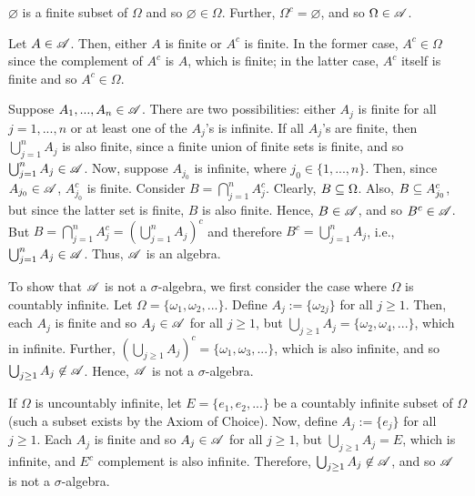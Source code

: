 \begin{solution}
$\varnothing$ is a finite subset of $\Omega$ and so $\varnothing \in \Omega$. Further, $\Omega^c = \varnothing$, and so $\Omega \in \mathscr{A}$. 

Let $A \in \mathscr{A}$. Then, either $A$ is finite or $A^c$ is finite. In the former case, $A^c \in \Omega$ since the complement of $A^c$ is $A$, which is finite; in the latter case, $A^c$ itself is finite and so $A^c \in \Omega$.

Suppose $A_1, ..., A_n \in \mathscr{A}$. There are two possibilities: either $A_j$ is finite for all $j = 1, ..., n$ or at least one of the $A_j$'s is infinite. If all $A_j$'s are finite, then $\bigcup_{j = 1}^n A_j$ is also finite, since a finite union of finite sets is finite, and so $\bigcup_{j = 1}^n A_j \in \mathscr{A}$. Now, suppose $A_{j_0}$ is infinite, where $j_0 \in \{1, ..., n\}$. Then, since $A_{j_0} \in \mathscr{A}$, $A_{j_0}^c$ is finite. Consider $B = \bigcap_{j = 1}^n A_j^c$. Clearly, $B \subseteq \Omega$. Also, $B \subseteq A_{j_0}^c$, but since the latter set is finite, $B$ is also finite. Hence, $B \in \mathscr{A}$, and so $B^c \in \mathscr{A}$. But $B = \bigcap_{j = 1}^n A_j^c = (\bigcup_{j = 1}^nA_j)^c$ and therefore $B^c = \bigcup_{j = 1}^n A_j$, i.e., $\bigcup_{j = 1}^nA_j \in \mathscr{A}$. Thus, $\mathscr{A}$ is an algebra.

To show that $\mathscr{A}$ is not a $\sigma$-algebra, we first consider the case where $\Omega$ is countably infinite. Let $\Omega = \{ \omega_1, \omega_2,...\}$. Define $A_j := \{ \omega_{2j}\}$ for all $j \geq 1$. Then, each $A_j$ is finite and so $A_j \in \mathscr{A}$ for all $j \geq 1$, but $\bigcup_{j \geq 1} A_j = \{ \omega_2, \omega_4, ...\}$, which in infinite. Further, $(\bigcup_{j \geq 1} A_j)^c = \{\omega_1, \omega_3,...\}$, which is also infinite, and so $\bigcup_{j \geq 1} A_j \not\in \mathscr{A}$. Hence, $\mathscr{A}$ is not a $\sigma$-algebra.

If $\Omega$ is uncountably infinite, let $E = \{e_1, e_2, ...\}$ be a countably infinite subset of $\Omega$ (such a subset exists by the Axiom of Choice). Now, define $A_j := \{e_j\}$ for all $j \geq 1$. Each $A_j$ is finite and so $A_j \in \mathscr{A}$ for all $j \geq 1$, but $\bigcup_{j \geq 1} A_j = E$, which is infinite, and $E^c$ complement is also infinite. Therefore, $\bigcup_{j \geq 1} A_j \not\in \mathscr{A}$, and so $\mathscr{A}$ is not a $\sigma$-algebra.
\end{solution}
